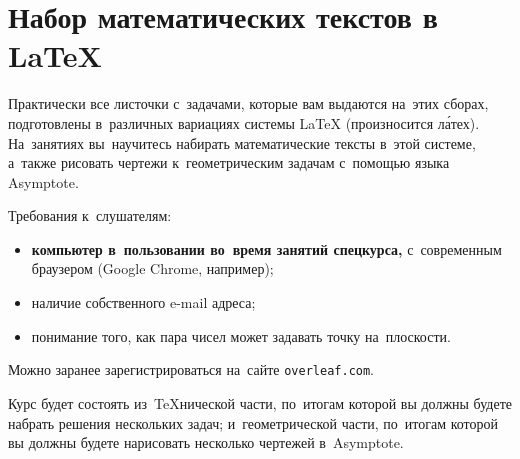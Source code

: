 \section*{Набор математических текстов в {\LaTeX}}

Практически все листочки с~задачами, которые вам выдаются на~этих сборах,
подготовлены в~различных вариациях системы {\LaTeX} (произносится л\'{а}тех).
На~занятиях вы~научитесь набирать математические тексты в~этой системе,
а~также рисовать чертежи к~геометрическим задачам с~помощью языка Asymptote.

Требования к~слушателям:
\begin{itemize}
\item
\textbf{компьютер в~пользовании во~время занятий спецкурса,}
с~современным браузером (Google Chrome, например);
\item
наличие собственного e-mail адреса;
\item
понимание того, как пара чисел может задавать точку на~плоскости.
\end{itemize}

Можно заранее зарегистрироваться на~сайте \texttt{overleaf.com}.

Курс будет состоять из~\TeX нической части, по~итогам которой вы должны будете
набрать решения нескольких задач;
и~геометрической части, по~итогам которой вы должны будете нарисовать несколько
чертежей в~Asymptote.

